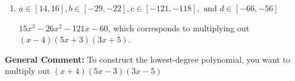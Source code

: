 \documentclass{extbook}[14pt]
\begin{document}
\begin{enumerate}
{\begin{enumerate}[label=\Alph*.]
$15x^{3} -76 x^{2} +49 x + 60$, which corresponds to multiplying out $(x -4)(5x + 3)(3x -5)$.
\item \( a \in [14, 16], b \in [-29, -22], c \in [-121, -118], \text{ and } d \in [-66, -56] \)

$15x^{3} -26 x^{2} -121 x -60$, which corresponds to multiplying out $(x -4)(5x + 3)(3x + 5)$.
\end{enumerate}

\textbf{General Comment:} To construct the lowest-degree polynomial, you want to multiply out $(x + 4)(5x -3)(3x -5)$
}
\end{enumerate}
\end{document}
